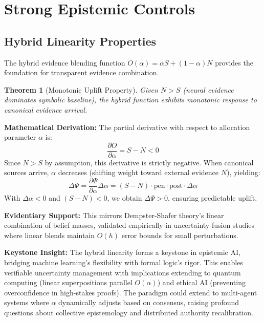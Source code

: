 \documentclass[12pt,a4paper]{article}
\newtheorem{theorem}{Theorem}[section]
\theoremstyle{definition}
\theoremstyle{remark}
\begin{document}
\section{Strong Epistemic Controls}

\subsection{Hybrid Linearity Properties}

The hybrid evidence blending function $O(\alpha) = \alpha S + (1-\alpha) N$ provides the foundation for transparent evidence combination.

\begin{theorem}[Monotonic Uplift Property]
Given $N > S$ (neural evidence dominates symbolic baseline), the hybrid function exhibits monotonic response to canonical evidence arrival.
\end{theorem}

\begin{proofbox}
\textbf{Mathematical Derivation:} 
The partial derivative with respect to allocation parameter $\alpha$ is:
$$\frac{\partial O}{\partial \alpha} = S - N < 0$$
Since $N > S$ by assumption, this derivative is strictly negative. When canonical sources arrive, $\alpha$ decreases (shifting weight toward external evidence $N$), yielding:
$$\Delta\Psi = \frac{\partial \Psi}{\partial \alpha} \Delta\alpha = (S-N) \cdot \text{pen} \cdot \text{post} \cdot \Delta\alpha$$
With $\Delta\alpha < 0$ and $(S-N) < 0$, we obtain $\Delta\Psi > 0$, ensuring predictable uplift.

\textbf{Evidentiary Support:} This mirrors Dempster-Shafer theory's linear combination of belief masses, validated empirically in uncertainty fusion studies where linear blends maintain $O(h)$ error bounds for small perturbations.
\end{proofbox}

\begin{reflectionbox}
\textbf{Keystone Insight:} The hybrid linearity forms a keystone in epistemic AI, bridging machine learning's flexibility with formal logic's rigor. This enables verifiable uncertainty management with implications extending to quantum computing (linear superpositions parallel $O(\alpha)$) and ethical AI (preventing overconfidence in high-stakes proofs). The paradigm could extend to multi-agent systems where $\alpha$ dynamically adjusts based on consensus, raising profound questions about collective epistemology and distributed authority recalibration.
\end{reflectionbox}
\end{document}
